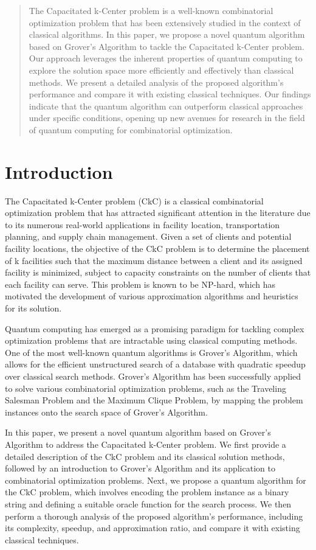 \begin{abstract}
The Capacitated k-Center problem is a well-known combinatorial optimization problem that has been extensively studied in the context of classical algorithms. In this paper, we propose a novel quantum algorithm based on Grover's Algorithm to tackle the Capacitated k-Center problem. Our approach leverages the inherent properties of quantum computing to explore the solution space more efficiently and effectively than classical methods. We present a detailed analysis of the proposed algorithm's performance and compare it with existing classical techniques. Our findings indicate that the quantum algorithm can outperform classical approaches under specific conditions, opening up new avenues for research in the field of quantum computing for combinatorial optimization.
\end{abstract}

\section{Introduction}

The Capacitated k-Center problem (CkC) is a classical combinatorial optimization problem that has attracted significant attention in the literature due to its numerous real-world applications in facility location, transportation planning, and supply chain management. Given a set of clients and potential facility locations, the objective of the CkC problem is to determine the placement of k facilities such that the maximum distance between a client and its assigned facility is minimized, subject to capacity constraints on the number of clients that each facility can serve. This problem is known to be NP-hard, which has motivated the development of various approximation algorithms and heuristics for its solution.

Quantum computing has emerged as a promising paradigm for tackling complex optimization problems that are intractable using classical computing methods. One of the most well-known quantum algorithms is Grover's Algorithm, which allows for the efficient unstructured search of a database with quadratic speedup over classical search methods. Grover's Algorithm has been successfully applied to solve various combinatorial optimization problems, such as the Traveling Salesman Problem and the Maximum Clique Problem, by mapping the problem instances onto the search space of Grover's Algorithm.

In this paper, we present a novel quantum algorithm based on Grover's Algorithm to address the Capacitated k-Center problem. We first provide a detailed description of the CkC problem and its classical solution methods, followed by an introduction to Grover's Algorithm and its application to combinatorial optimization problems. Next, we propose a quantum algorithm for the CkC problem, which involves encoding the problem instance as a binary string and defining a suitable oracle function for the search process. We then perform a thorough analysis of the proposed algorithm's performance, including its complexity, speedup, and approximation ratio, and compare it with existing classical techniques.


